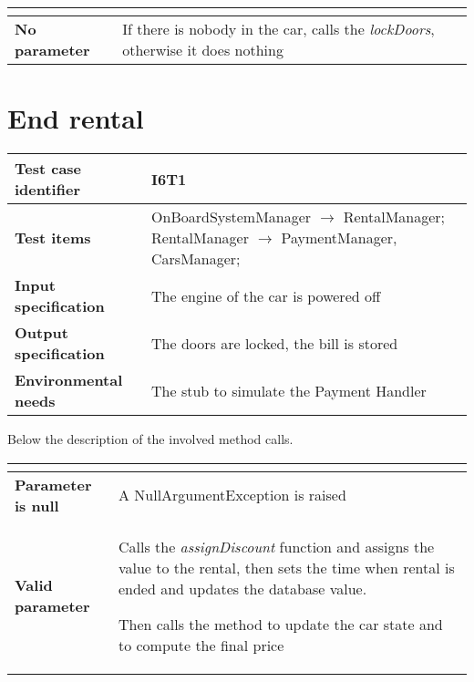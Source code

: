 \documentclass{scrreprt}
\begin{document}
\begin{center}
\begin{tabularx}{\columnwidth}{>{\bfseries}XX}
\toprule
\multicolumn{2}{>{\bfseries}c}{\textit{OnBoardSystemManager $\longrightarrow$  checkNobodyInTheCar()}}\\
\toprule

No parameter & If there is nobody in the car, calls the \emph{lockDoors}, otherwise it does nothing\\

\bottomrule
\end{tabularx}
\end{center}

\section{End rental}

\begin{center}
\begin{tabularx}{\columnwidth}{>{\bfseries}lX}
\toprule
Test case identifier & I6T1\\
\midrule
Test items & OnBoardSystemManager $\longrightarrow$ RentalManager; RentalManager $\longrightarrow$ PaymentManager, CarsManager;\\
\midrule
Input specification & The engine of the car is powered off\\
\midrule
Output specification & The doors are locked, the bill is stored\\
\midrule
Environmental needs & The stub to simulate the Payment Handler\\
\bottomrule
\end{tabularx}
\end{center}

Below the description of the involved method calls.

\begin{center}
\begin{tabularx}{\columnwidth}{>{\bfseries}XX}
\toprule
\multicolumn{2}{>{\bfseries}c}{\textit{RentalManager $\longrightarrow$  endRental(rental)}}\\
\toprule

Parameter is null & A NullArgumentException is raised\\
\midrule
Valid parameter & Calls the \emph{assignDiscount} function and assigns the value to the rental, then sets the time when rental is ended and updates the database value.

Then calls the method to update the car state and to compute the final price\\
\bottomrule
\end{tabularx}
\end{center}
\end{document}
